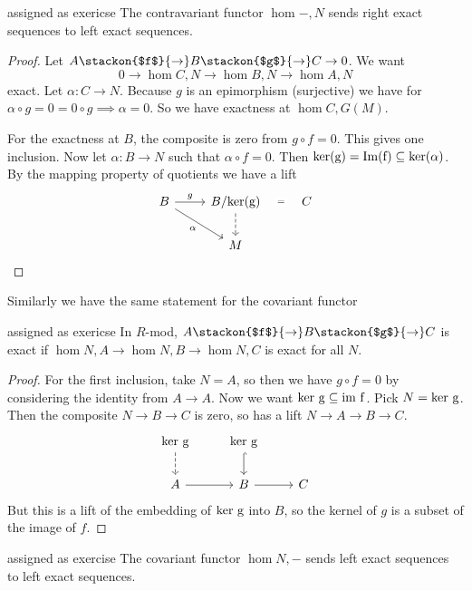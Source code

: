 \begin{aproposition}{assigned as exericse}{}
    The contravariant functor $\hom{-,N}$ sends right exact sequences to left exact sequences.
\end{aproposition}
\begin{proof}
     Let $A\stackon{$f$}{\to} B \stackon{$g$}{\to} C \to 0$. We want \[
     0\to \hom{C,N} \to \hom{B,N}\to \hom{A,N}
     \]
     exact.
    Let $\alpha:C\to N$. Because $g$ is an epimorphism (surjective) we have for $\alpha\circ g=0=0\circ g \implies \alpha=0$. So we have exactness at $\hom{C,G(M)}$.

    For the exactness at $B$, the composite is zero from $g\circ f=0$. This gives one inclusion. Now let $\alpha:B\to N$ such that $\alpha\circ f=0$. Then $\rm{ker}(g)=\rm{Im}(f)\subseteq \rm{ker}(\alpha)$. By the mapping property of quotients we have a lift
\[\begin{tikzcd}
	B & {B/\rm{ker}(g)} & C \\
	& M
	\arrow["g", from=1-1, to=1-2]
	\arrow["\alpha"', from=1-1, to=2-2]
	\arrow["{=}"{description}, draw=none, from=1-2, to=1-3]
	\arrow[dashed,from=1-2, to=2-2]
\end{tikzcd}\]

\end{proof}
Similarly we have the same statement for the covariant functor
\begin{aproposition}{assigned as exericse}{}
      In $R$-mod, $A\stackon{$f$}{\to} B \stackon{$g$}{\to} C$ is exact if $\hom{N,A}\to \hom{N,B} \to \hom{N,C}$ is exact for all $N$.


\end{aproposition}
\begin{proof}
    For the first inclusion, take $N=A$, so then we have $g\circ f =0$ by considering the identity from $A\to A$. Now we want $\rm{ker} \ g \subseteq \rm{im} \ f$. Pick $N=\rm{ker} \ g$. Then the composite $N\to B \to C$ is zero, so has a lift $N\to A\to B \to C$.
    \[\begin{tikzcd}
	{\rm{ker} \ g} & {\rm{ker} \ g} \\
	A & B & C
	\arrow[dashed, from=1-1, to=2-1]
	\arrow[hook, from=1-2, to=2-2]
	\arrow[from=2-1, to=2-2]
	\arrow[from=2-2, to=2-3]
\end{tikzcd}\] But this is a lift of the embedding of $\rm{ker } \ g $ into $B$, so the kernel of $g$ is a subset of the image of $f$.
\end{proof}
\begin{aproposition}{assigned as exercise}  {}
    The covariant functor $\hom{N,-} $ sends left exact sequences to left exact sequences. 
\end{aproposition}
